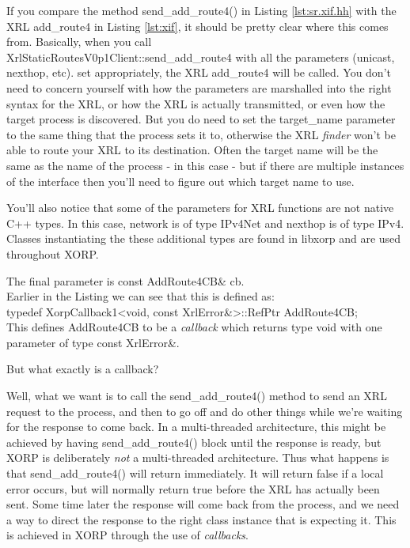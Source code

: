 \documentclass[11pt]{article}
\begin{document}
If you compare the method {\stt send\_add\_route4()} in Listing
\ref{lst:sr.xif.hh} with the XRL {\stt add\_route4} in Listing
\ref{lst:xif}, it should be pretty clear where this comes from.
Basically, when you call \\
{\stt XrlStaticRoutesV0p1Client::send\_add\_route4} with all the
parameters ({\stt unicast}, {\stt nexthop}, etc).  set appropriately,
the XRL {\stt add\_route4} will be called.  You don't need to concern
yourself with how the parameters are marshalled into the right syntax
for the XRL, or how the XRL is actually transmitted, or even how the
target process is discovered.  But you do need to set the {\stt
target\_name} parameter to the same thing that the \SR process sets it
to, otherwise the XRL {\it finder} won't be able to route your XRL to
its destination.  Often the target name will be the same as the name
of the process - in this case \SRI - but if there are multiple
instances of the interface then you'll need to figure out which target
name to use.

You'll also notice that some of the parameters for XRL functions are
not native C++ types.  In this case, {\stt network} is of type {\stt
IPv4Net} and {\stt nexthop} is of type {\stt IPv4}.  Classes
instantiating the these additional types are found in {\stt libxorp}
and are used throughout XORP.  

The final parameter is {\stt const AddRoute4CB\& cb}.\\
Earlier in the
Listing we can see that this is defined as:\\
{\stt typedef XorpCallback1<void, const XrlError\&>::RefPtr
  AddRoute4CB;}\\
This defines {\stt AddRoute4CB} to be a {\it callback} which returns type
{\stt void} with one parameter of type {\stt const XrlError\&}.

But what exactly is a {\stt callback}?

Well, what we want is to call the {\stt send\_add\_route4()} method to
send an XRL request to the \SRI process, and then to go off and do
other things while we're waiting for the response to come back.  In a
multi-threaded architecture, this might be achieved by having {\stt
send\_add\_route4()} block until the response is ready, but XORP is
deliberately {\it not} a multi-threaded architecture. Thus what
happens is that {\stt send\_add\_route4()} will return immediately.
It will return false if a local error occurs, but will normally return
true before the XRL has actually been sent.  Some time later the
response will come back from the \SRI process, and we need a way to
direct the response to the right class instance that is expecting it.
This is achieved in XORP through the use of {\it callbacks}.
\end{document}
